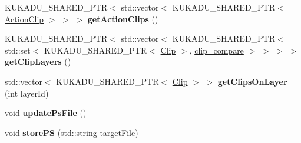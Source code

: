 \begin{DoxyCompactItemize}
\item 
K\+U\+K\+A\+D\+U\+\_\+\+S\+H\+A\+R\+E\+D\+\_\+\+P\+TR$<$ std\+::vector$<$ K\+U\+K\+A\+D\+U\+\_\+\+S\+H\+A\+R\+E\+D\+\_\+\+P\+TR$<$ \hyperlink{classkukadu_1_1ActionClip}{Action\+Clip} $>$ $>$ $>$ {\bfseries get\+Action\+Clips} ()\hypertarget{classkukadu_1_1ProjectiveSimulator_a41b6e2ac27ec4ecc22361fa5e7569699}{}\label{classkukadu_1_1ProjectiveSimulator_a41b6e2ac27ec4ecc22361fa5e7569699}

\item 
K\+U\+K\+A\+D\+U\+\_\+\+S\+H\+A\+R\+E\+D\+\_\+\+P\+TR$<$ std\+::vector$<$ K\+U\+K\+A\+D\+U\+\_\+\+S\+H\+A\+R\+E\+D\+\_\+\+P\+TR$<$ std\+::set$<$ K\+U\+K\+A\+D\+U\+\_\+\+S\+H\+A\+R\+E\+D\+\_\+\+P\+TR$<$ \hyperlink{classkukadu_1_1Clip}{Clip} $>$, \hyperlink{structkukadu_1_1clip__compare}{clip\+\_\+compare} $>$ $>$ $>$ $>$ {\bfseries get\+Clip\+Layers} ()\hypertarget{classkukadu_1_1ProjectiveSimulator_a095634e6ccec95d061b9327c74c548f7}{}\label{classkukadu_1_1ProjectiveSimulator_a095634e6ccec95d061b9327c74c548f7}

\item 
std\+::vector$<$ K\+U\+K\+A\+D\+U\+\_\+\+S\+H\+A\+R\+E\+D\+\_\+\+P\+TR$<$ \hyperlink{classkukadu_1_1Clip}{Clip} $>$ $>$ {\bfseries get\+Clips\+On\+Layer} (int layer\+Id)\hypertarget{classkukadu_1_1ProjectiveSimulator_a705de6305d606ba41f0057279a3a9963}{}\label{classkukadu_1_1ProjectiveSimulator_a705de6305d606ba41f0057279a3a9963}

\item 
void {\bfseries update\+Ps\+File} ()\hypertarget{classkukadu_1_1ProjectiveSimulator_ae65467c2fdeebf45195a339d4546be9a}{}\label{classkukadu_1_1ProjectiveSimulator_ae65467c2fdeebf45195a339d4546be9a}

\item 
void {\bfseries store\+PS} (std\+::string target\+File)\hypertarget{classkukadu_1_1ProjectiveSimulator_ac488f5b98aeafa9704a2a1cbff78d433}{}\label{classkukadu_1_1ProjectiveSimulator_ac488f5b98aeafa9704a2a1cbff78d433}

\end{DoxyCompactItemize}
